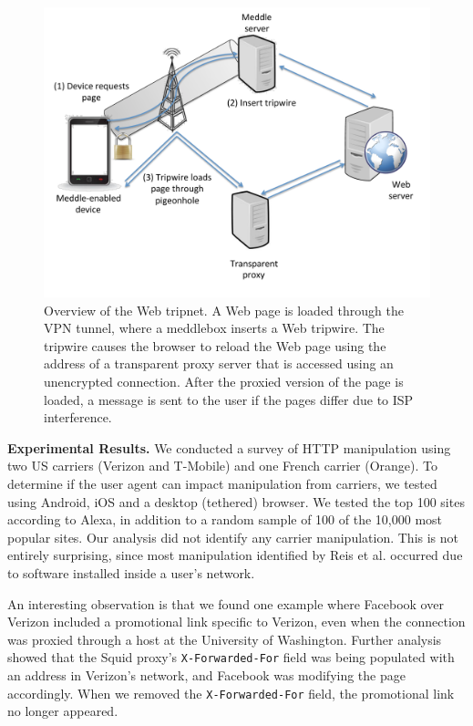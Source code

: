 \begin{figure}
\centering
        \includegraphics[width=\linewidth]{figs/tripnet.pdf}
\vspace{\figcapspace}
  \caption{Overview of the \meddle Web tripnet. A Web page is loaded 
through the VPN tunnel, where a meddlebox inserts a Web tripwire. The 
tripwire causes the browser to reload the Web page using the address of a
transparent proxy server that is accessed using an unencrypted connection. 
After the proxied version of the page is loaded, a message is sent to the user if 
the pages differ due to ISP interference. }
  \label{fig:tripnet}
\vspace{\postfigspace}
\end{figure}

\noindent\textbf{Experimental Results.} We conducted a survey of HTTP manipulation using two US carriers (Verizon and T-Mobile) 
and one French carrier (Orange). To determine if the user agent can impact manipulation from 
carriers, we tested using Android, iOS and a desktop (tethered) browser. We tested the top 
100 sites according to Alexa, in addition to a random sample of 100 of the 10,000 most popular 
sites. Our analysis did not identify any carrier manipulation. This is not entirely surprising, 
since most manipulation identified by Reis et al. occurred due to software installed inside 
a user's network.

An interesting observation is that 
we found one example where Facebook over Verizon included a promotional link specific to 
Verizon, even when the connection was proxied through a host at the University of Washington. 
Further analysis showed that the Squid proxy's {\tt X-Forwarded-For} field was being populated 
with an address in Verizon's network, and Facebook was modifying the page accordingly. When 
we removed the {\tt X-Forwarded-For} field, the promotional link no longer appeared. 

